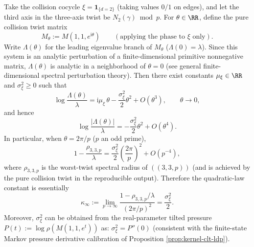 \begin{remark}\label{prop:arity-335-kappa-variance}
Take the collision cocycle \(\xi=\mathbf{1}_{\{d=2\}}\) (taking values \(0/1\) on edges), and let the third axis in the three-axis twist be \(N_2(\gamma)\bmod p\).
For \(\theta\in\RR\), define the pure collision twist matrix
$$
M_\theta:=M(1,1,e^{\mathrm{i}\theta})\qquad(\text{applying the phase to }\xi\text{ only}).
$$
Write \(\Lambda(\theta)\) for the leading eigenvalue branch of \(M_\theta\) (\(\Lambda(0)=\lambda\)).
Since this system is an analytic perturbation of a finite-dimensional primitive nonnegative matrix, \(\Lambda(\theta)\) is analytic in a neighborhood of \(\theta=0\) (see general finite-dimensional spectral perturbation theory).
Then there exist constants \(\mu_\xi\in\RR\) and \(\sigma_\xi^2\ge 0\) such that
$$
\log\frac{\Lambda(\theta)}{\lambda}
=
\mathrm{i}\mu_\xi\,\theta-\frac{\sigma_\xi^2}{2}\theta^2+O(\theta^3),
\qquad \theta\to 0,
$$
and hence
$$
\log\frac{|\Lambda(\theta)|}{\lambda}
=
-\frac{\sigma_\xi^2}{2}\theta^2+O(\theta^4).
$$
In particular, when \(\theta=2\pi/p\) (\(p\) an odd prime),
$$
1-\frac{\rho_{3,3,p}}{\lambda}
=
\frac{\sigma_\xi^2}{2}\left(\frac{2\pi}{p}\right)^2
+
O\!\left(p^{-4}\right),
$$
where \(\rho_{3,3,p}\) is the worst-twist spectral radius of \( ((3,3,p))\) (and is achieved by the pure collision twist in the reproducible output).
Therefore the quadratic-law constant is essentially
$$
\kappa_\infty:=\lim_{p\to\infty}\frac{1-\rho_{3,3,p}/\lambda}{(2\pi/p)^2}
=\frac{\sigma_\xi^2}{2}.
$$
Moreover, \(\sigma_\xi^2\) can be obtained from the real-parameter tilted pressure
\(
P(t):=\log\rho(M(1,1,e^t))
\)
as: \(\sigma_\xi^2=P''(0)\) (consistent with the finite-state Markov pressure derivative calibration of Proposition \ref{prop:kernel-clt-ldp}).
\end{remark}


